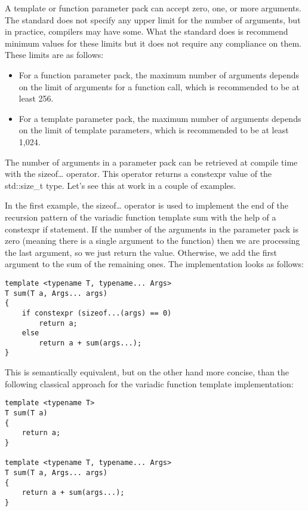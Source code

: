 
A template or function parameter pack can accept zero, one, or more arguments. The standard does not specify any upper limit for the number of arguments, but in practice, compilers may have some. What the standard does is recommend minimum values for these limits but it does not require any compliance on them. These limits are as follows:

\begin{itemize}
\item
For a function parameter pack, the maximum number of arguments depends on the limit of arguments for a function call, which is recommended to be at least 256.

\item
For a template parameter pack, the maximum number of arguments depends on the limit of template parameters, which is recommended to be at least 1,024.
\end{itemize}

The number of arguments in a parameter pack can be retrieved at compile time with the sizeof… operator. This operator returns a constexpr value of the std::size\_t type. Let's see this at work in a couple of examples.

In the first example, the sizeof… operator is used to implement the end of the recursion pattern of the variadic function template sum with the help of a constexpr if statement. If the number of the arguments in the parameter pack is zero (meaning there is a single argument to the function) then we are processing the last argument, so we just return the value. Otherwise, we add the first argument to the sum of the remaining ones. The implementation looks as follows:

\begin{lstlisting}[style=styleCXX]
template <typename T, typename... Args>
T sum(T a, Args... args)
{
	if constexpr (sizeof...(args) == 0)
		return a;
	else
		return a + sum(args...);
}
\end{lstlisting}

This is semantically equivalent, but on the other hand more concise, than the following classical approach for the variadic function template implementation:

\begin{lstlisting}[style=styleCXX]
template <typename T>
T sum(T a)
{
	return a;
}

template <typename T, typename... Args>
T sum(T a, Args... args)
{
	return a + sum(args...);
}
\end{lstlisting}

